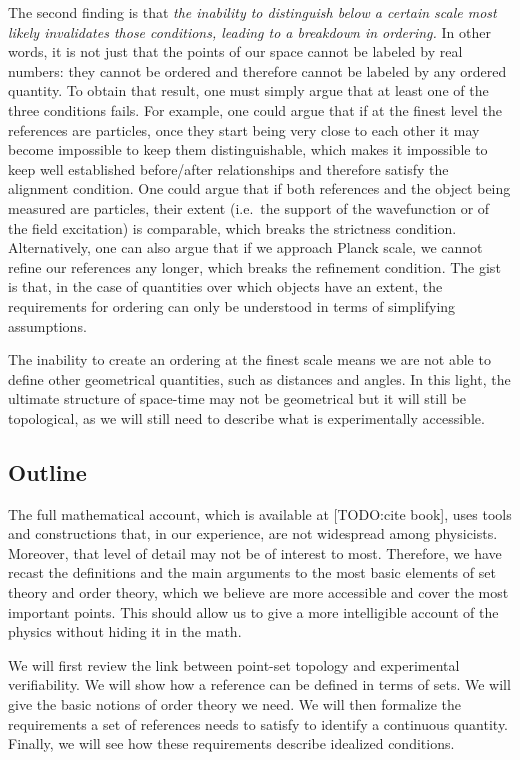 \documentclass[12pt]{iopart}
\begin{document}
The second finding is that \emph{the inability to distinguish below a certain scale most likely invalidates those conditions, leading to a breakdown in ordering.} In other words, it is not just that the points of our space cannot be labeled by real numbers: they cannot be ordered and therefore cannot be labeled by any ordered quantity. To obtain that result, one must simply argue that at least one of the three conditions fails. For example, one could argue that if at the finest level the references are particles, once they start being very close to each other it may become impossible to keep them distinguishable, which makes it impossible to keep well established before/after relationships and therefore satisfy the alignment condition. One could argue that if both references and the object being measured are particles, their extent (i.e.~the support of the wavefunction or of the field excitation) is comparable, which breaks the strictness condition. Alternatively, one can also argue that if we approach Planck scale, we cannot refine our references any longer, which breaks the refinement condition. The gist is that, in the case of quantities over which objects have an extent, the requirements for ordering can only be understood in terms of simplifying assumptions.

The inability to create an ordering at the finest scale means we are not able to define other geometrical quantities, such as distances and angles. In this light, the ultimate structure of space-time may not be geometrical but it will still be topological, as we will still need to describe what is experimentally accessible.

\subsection{Outline}

The full mathematical account, which is available at [TODO:cite book], uses tools and constructions that, in our experience, are not widespread among physicists. Moreover, that level of detail may not be of interest to most. Therefore, we have recast the definitions and the main arguments to the most basic elements of set theory and order theory, which we believe are more accessible and cover the most important points. This should allow us to give a more intelligible account of the physics without hiding it in the math.

We will first review the link between point-set topology and experimental verifiability. We will show how a reference can be defined in terms of sets. We will give the basic notions of order theory we need. We will then formalize the requirements a set of references needs to satisfy to identify a continuous quantity. Finally, we will see how these requirements describe idealized conditions.
\end{document}
